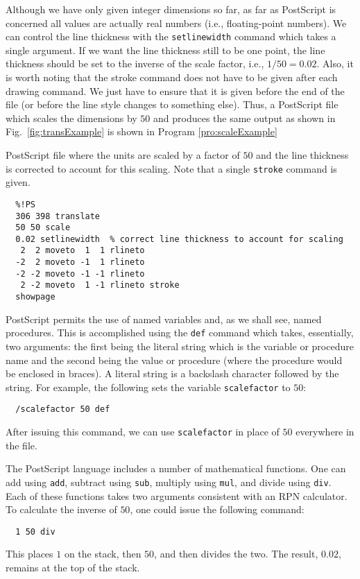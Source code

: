Although we have only given integer dimensions so far, as far as
PostScript is concerned all values are actually real numbers (i.e.,
floating-point numbers).  We can control the line thickness with the
{\tt setlinewidth} command which takes a single argument.  If we want
the line thickness still to be one point, the line thickness should be
set to the inverse of the scale factor, i.e., $1/50=0.02$.  Also, it
is worth noting that the stroke command does not have to be given
after each drawing command.  We just have to ensure that it is given
before the end of the file (or before the line style changes to
something else).  Thus, a PostScript file which scales the dimensions
by $50$ and produces the same output as shown in Fig.\
\ref{fig:transExample} is shown in Program \ref{pro:scaleExample}
\begin{program}
PostScript file where the units are scaled by a factor of $50$ and the
line thickness is corrected to account for this scaling.  Note that a
single {\tt stroke} command is given.
\label{pro:scaleExampleI}
\codemiddle
\begin{verbatim}
  %!PS
  306 398 translate
  50 50 scale
  0.02 setlinewidth  % correct line thickness to account for scaling
   2  2 moveto  1  1 rlineto
  -2  2 moveto -1  1 rlineto
  -2 -2 moveto -1 -1 rlineto
   2 -2 moveto  1 -1 rlineto stroke
  showpage
\end{verbatim}
\end{program}

PostScript permits the use of named variables and, as we shall see,
named procedures.  This is accomplished using the {\tt def} command
which takes, essentially, two arguments: the first being the literal
string which is the variable or procedure name and the second being
the value or procedure (where the procedure would be enclosed in
braces).  A literal string is a backslash character followed by the
string.  For example, the following sets the variable {\tt scalefactor} to
$50$:
\begin{verbatim}
  /scalefactor 50 def
\end{verbatim}
After issuing this command, we can use {\tt scalefactor} in place of
$50$ everywhere in the file.

The PostScript language includes a number of mathematical functions.
One can add using {\tt add}, subtract using {\tt sub}, multiply using
{\tt mul}, and divide using {\tt div}.  Each of these functions takes
two arguments consistent with an RPN calculator.  To calculate
the inverse of $50$, one could issue the following command:
\begin{verbatim}
  1 50 div
\end{verbatim}
This places $1$ on the stack, then $50$, and then divides the two.  The
result, $0.02$, remains at the top of the stack.

